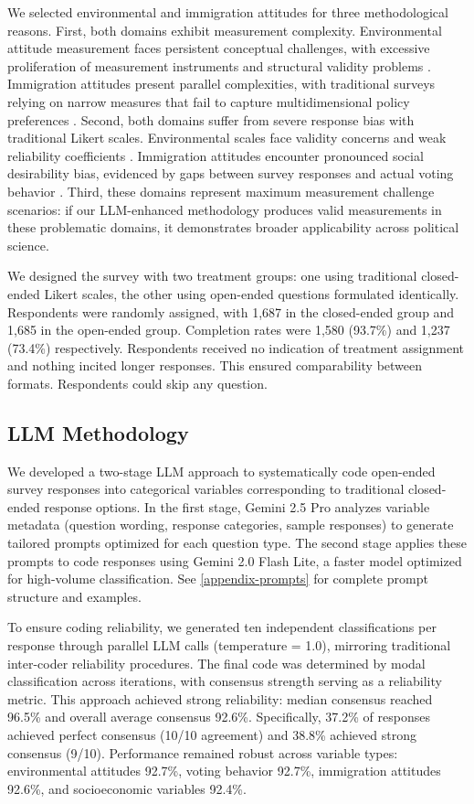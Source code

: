 \documentclass[
  journal=ram,
  manuscript=article-type,
  year=2025,
  volume=unpublished,
]{cup-journal}
\begin{document}
We selected environmental and immigration attitudes for three methodological reasons. First, both domains exhibit measurement complexity. Environmental attitude measurement faces persistent conceptual challenges, with excessive proliferation of measurement instruments and structural validity problems \citep{cruz_manata20}. Immigration attitudes present parallel complexities, with traditional surveys relying on narrow measures that fail to capture multidimensional policy preferences \citep{hainmueller_hopkins14}. Second, both domains suffer from severe response bias with traditional Likert scales. Environmental scales face validity concerns and weak reliability coefficients \citep{cruz_manata20}. Immigration attitudes encounter pronounced social desirability bias, evidenced by gaps between survey responses and actual voting behavior \citep{hainmueller_hopkins14}. Third, these domains represent maximum measurement challenge scenarios: if our LLM-enhanced methodology produces valid measurements in these problematic domains, it demonstrates broader applicability across political science.

We designed the survey with two treatment groups: one using traditional closed-ended Likert scales, the other using open-ended questions formulated identically. Respondents were randomly assigned, with 1,687 in the closed-ended group and 1,685 in the open-ended group. Completion rates were 1,580 (93.7\%) and 1,237 (73.4\%) respectively. Respondents received no indication of treatment assignment and nothing incited longer responses. This ensured comparability between formats. Respondents could skip any question.

\subsection{LLM Methodology}

We developed a two-stage LLM approach to systematically code open-ended survey responses into categorical variables corresponding to traditional closed-ended response options. In the first stage, Gemini 2.5 Pro analyzes variable metadata (question wording, response categories, sample responses) to generate tailored prompts optimized for each question type. The second stage applies these prompts to code responses using Gemini 2.0 Flash Lite, a faster model optimized for high-volume classification. See \ref{appendix-prompts} for complete prompt structure and examples.

To ensure coding reliability, we generated ten independent classifications per response through parallel LLM calls (temperature = 1.0), mirroring traditional inter-coder reliability procedures. The final code was determined by modal classification across iterations, with consensus strength serving as a reliability metric. This approach achieved strong reliability: median consensus reached 96.5\% and overall average consensus 92.6\%. Specifically, 37.2\% of responses achieved perfect consensus (10/10 agreement) and 38.8\% achieved strong consensus (9/10). Performance remained robust across variable types: environmental attitudes 92.7\%, voting behavior 92.7\%, immigration attitudes 92.6\%, and socioeconomic variables 92.4\%.
\end{document}
